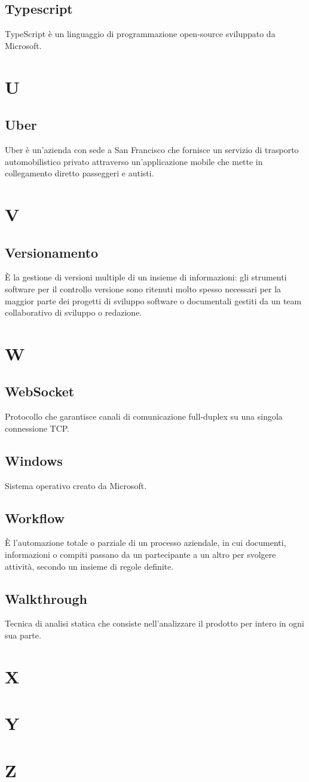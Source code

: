\subsection{Typescript} TypeScript è un linguaggio di programmazione open-source sviluppato da Microsoft.
\newpage \section{U}
\subsection{Uber} Uber è un'azienda con sede a San Francisco che fornisce un servizio di trasporto automobilistico privato attraverso un'applicazione mobile che mette in collegamento diretto passeggeri e autisti.
\newpage \section{V}
\subsection{Versionamento} È la gestione di versioni multiple di un insieme di informazioni: gli strumenti software per il controllo versione sono ritenuti molto spesso necessari per la maggior parte dei progetti di sviluppo software o documentali gestiti da un team collaborativo di sviluppo o redazione.
\newpage \section{W}
\subsection{WebSocket} Protocollo che garantisce canali di comunicazione full-duplex su una singola connessione TCP.
\subsection{Windows} Sistema operativo creato da Microsoft.
\subsection{Workflow} È l’automazione totale o parziale di un processo aziendale, in cui documenti, informazioni o compiti passano da un partecipante a un altro per svolgere attività, secondo un insieme di regole definite.
\subsection{Walkthrough} Tecnica di analisi statica che consiste nell’analizzare il prodotto per intero in ogni sua parte.
\newpage \section{X}
\newpage \section{Y}
\newpage \section{Z}
